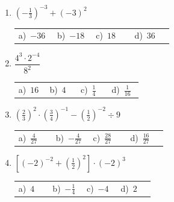\documentclass[11pt,a4paper]{article}
\begin{document}
\begin{enumerate}[label=\textbf{\arabic*.},leftmargin=*,itemsep=11pt,topsep=0pt]
\item \begin{minipage}[t]{\linewidth}
$\displaystyle \left(-\frac{1}{3}\right)^{-3}+(-3)^{2}$

\vspace{5pt}
\begin{tabular}{@{}p{0.23\linewidth}p{0.23\linewidth}p{0.23\linewidth}p{0.23\linewidth}@{}}
a)~$\displaystyle -36$ & b)~$\displaystyle -18$ & c)~$\displaystyle 18$ & d)~$\displaystyle 36$ \\
\end{tabular}
\end{minipage}

\item \begin{minipage}[t]{\linewidth}
$\displaystyle \dfrac{4^{3}\cdot 2^{-4}}{8^{2}}$

\vspace{5pt}
\begin{tabular}{@{}p{0.23\linewidth}p{0.23\linewidth}p{0.23\linewidth}p{0.23\linewidth}@{}}
a)~$\displaystyle 16$ & b)~$\displaystyle 4$ & c)~$\displaystyle \frac{1}{4}$ & d)~$\displaystyle \frac{1}{16}$ \\
\end{tabular}
\end{minipage}

\item \begin{minipage}[t]{\linewidth}
$\displaystyle \left(\frac{2}{3}\right)^{2}\cdot\left(\frac{3}{4}\right)^{-1}-\left(\frac{1}{2}\right)^{-2}\div 9$

\vspace{5pt}
\begin{tabular}{@{}p{0.23\linewidth}p{0.23\linewidth}p{0.23\linewidth}p{0.23\linewidth}@{}}
a)~$\displaystyle \frac{4}{27}$ & b)~$\displaystyle -\frac{4}{27}$ & c)~$\displaystyle \frac{28}{27}$ & d)~$\displaystyle \frac{16}{27}$ \\
\end{tabular}
\end{minipage}

\item \begin{minipage}[t]{\linewidth}
$\displaystyle \left[(-2)^{-2}+\left(\frac{1}{2}\right)^{2}\right]\cdot(-2)^{3}$

\vspace{5pt}
\begin{tabular}{@{}p{0.23\linewidth}p{0.23\linewidth}p{0.23\linewidth}p{0.23\linewidth}@{}}
a)~$\displaystyle 4$ & b)~$\displaystyle -\frac{1}{4}$ & c)~$\displaystyle -4$ & d)~$\displaystyle 2$ \\
\end{tabular}
\end{minipage}


\end{enumerate}
\end{document}
